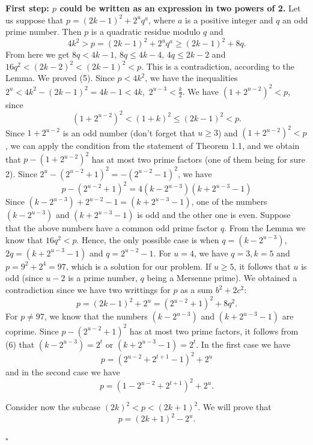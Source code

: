 \documentclass[12pt]{article}
\newenvironment{proof}{{\it Proof.}}{\hfill $ \square $ \vskip 4mm}
\begin{document}
{\begin{proof} {\bf First step: $p$ could be written as an expression in two powers of 2.}
Let us suppose that $p=(2k-1)^2+2^uq^a$, where $a$ is a positive integer and $q$ an odd prime number. Then $p$ is a quadratic residue modulo $q$ and 
$$4k^2>p=(2k-1)^2+2^uq^a\geq (2k-1)^2+8q.$$
From here we get $8q<4k-1$, $8q\leq 4k-4$, $4q\leq 2k-2$ and $16q^2<(2k-2)^2<(2k-1)^2<p$. This is a contradiction, according to the Lemma. We proved (5). Since $p<4k^2$, we have the inequalities $2^u<4k^2-(2k-1)^2=4k-1<4k,$ $2^{u-3}<\frac{k}{2}$. We have $(1+2^{u-2})^2<p$, since $$(1+2^{u-2})^2<(1+k)^2\leq (2k-1)^2<p.$$
Since $1+2^{u-2}$ is an odd number (don't forget that $u\geq 3$) and $(1+2^{u-2})^2<p$, we can apply the condition from the statement of Theorem 1.1, and we obtain that $p-(1+2^{u-2})^2$ has at most two prime factors (one of them being for sure 2). Since $2^u-(2^{u-2}+1)^2=-(2^{u-2}-1)^2$, we have 
\begin{equation}
p-(2^{u-2}+1)^2=4(k-2^{u-3})(k+2^{u-3}-1)
\end{equation}
Since $(k-2^{u-3})+2^{u-2}-1=(k+2^{u-3}-1)$, one of the numbers $(k-2^{u-3})$ and $(k+2^{u-3}-1)$ is odd and the other one is even. Suppose that the above numbers have a common odd prime factor $q$. From the Lemma we know that $16q^2<p$. Hence, the only possible case is when $q=(k-2^{u-3})$, $2q=(k+2^{u-3}-1)$ and $q=2^{u-2}-1$.
For $u=4$, we have $q=3,k=5$ and $p=9^2+2^4=97$, which is a solution for our problem. If $u\geq 5$, it follows that $u$ is odd (since $u-2$ is a prime number, $q$ being a Mersenne prime). We obtained a contradiction since we have two writtings for $p$ as a sum $b^2+2c^2$:
$$p=(2k-1)^2+2^u=(2^{u-2}+1)^2+8q^2.$$
For $p\neq 97$, we know that the numbers $(k-2^{u-3})$ and $(k+2^{u-3}-1)$ are coprime. Since $p-(2^{u-2}+1)^2$ has at most two prime factors, it follows from (6) that $(k-2^{u-3})=2^t$ or $(k+2^{u-3}-1)=2^t$. In the first case we have 
\begin{equation}
p=(2^{u-2}+2^{t+1}-1)^2+2^u
\end{equation}
and in the second case we have
\begin{equation}
p=(1-2^{u-2}+2^{t+1})^2+2^u.
\end{equation}

Consider now the subcase $(2k)^2<p<(2k+1)^2$. We will prove that \begin{equation}p=(2k+1)^2-2^u.
\end{equation}


\end{proof}}
\end{document}
